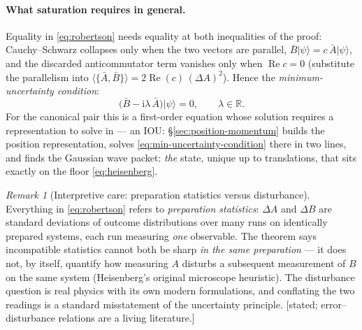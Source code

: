 \documentclass[11pt]{article}
\theoremstyle{plain}
\theoremstyle{definition}
\theoremstyle{remark}
\newtheorem{remark}[theorem]{Remark}
\newcommand{\ii}{\mathrm{i}}
\newcommand{\R}{\mathbb{R}}
\newcommand{\ket}[1]{\lvert #1 \rangle}
\begin{document}
\paragraph{What saturation requires in general.} Equality in
\eqref{eq:robertson} needs equality at both inequalities of the
proof: Cauchy--Schwarz collapses only when the two vectors are
parallel, $\bar B\ket\psi = c\,\bar A\ket\psi$, and the discarded
anticommutator term vanishes only when
$\operatorname{Re} c = 0$ (substitute the parallelism into
$\langle\{\bar A,\bar B\}\rangle = 2\operatorname{Re}(c)\,
(\Delta A)^2$). Hence the \emph{minimum-uncertainty condition}:
\begin{equation}
  \bigl(\bar B - \ii\lambda\,\bar A\bigr)\ket\psi = 0,
  \qquad \lambda \in \R .
  \label{eq:min-uncertainty-condition}
\end{equation}
For the canonical pair this is a first-order equation whose solution
requires a representation to solve in --- an IOU:
\S\ref{sec:position-momentum} builds the position representation,
solves \eqref{eq:min-uncertainty-condition} there in two lines, and
finds the Gaussian wave packet: \emph{the} state, unique up to
translations, that sits exactly on the floor
\eqref{eq:heisenberg}.

\begin{remark}[Interpretive care: preparation statistics versus disturbance]
\label{rem:ensembles-not-disturbance}
Everything in \eqref{eq:robertson} refers to \emph{preparation
statistics}: $\Delta A$ and $\Delta B$ are standard deviations of
outcome distributions over many runs on identically prepared
systems, each run measuring \emph{one} observable. The theorem says
incompatible statistics cannot both be sharp \emph{in the same
preparation} --- it does not, by itself, quantify how measuring $A$
disturbs a subsequent measurement of $B$ on the same system
(Heisenberg's original microscope heuristic). The disturbance
question is real physics with its own modern formulations, and
conflating the two readings is a standard misstatement of the
uncertainty principle. [stated; error--disturbance
relations are a living literature.]
\end{remark}
\end{document}
